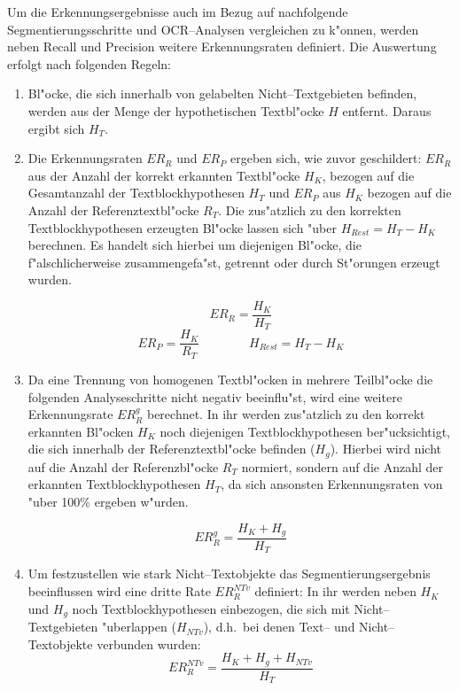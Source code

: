 Um die Erkennungsergebnisse auch im Bezug auf nachfolgende Segmentierungsschritte und OCR--Analysen
vergleichen zu k"onnen, werden neben Recall und Precision weitere Erkennungsraten definiert.
Die Auswertung erfolgt nach folgenden Regeln:
\begin{enumerate}
  \item Bl"ocke, die sich innerhalb von gelabelten Nicht--Textgebieten befinden,
  werden aus der Menge der hypothetischen Textbl"ocke $H$ entfernt. Daraus ergibt sich $H_T$.
  
  \item Die Erkennungsraten $ER_{R}$ und $ER_{P}$ ergeben sich, wie zuvor geschildert:
  $ER_{R}$ aus der Anzahl der korrekt erkannten Textbl"ocke $H_K$, bezogen auf die 
  Gesamtanzahl der Textblockhypothesen $H_T$ und $ER_{P}$ aus $H_K$ bezogen auf die Anzahl
  der Referenztextbl"ocke $R_T$. Die zus"atzlich zu den korrekten Textblockhypothesen
  erzeugten Bl"ocke lassen sich "uber $ H_{Rest} = H_T - H_K$ berechnen. Es handelt sich hierbei
  um diejenigen Bl"ocke, die f"alschlicherweise zusammengefa"st, 
  getrennt oder durch St"orungen erzeugt wurden.
  
  $$ER_{R} = \frac{H_K}{H_T}$$
  $$ER_{P} = \frac{H_K}{R_T}\qquad\qquad H_{Rest} = H_T - H_K$$
  
  \item Da eine Trennung von homogenen Textbl"ocken in mehrere Teilbl"ocke die folgenden
  Analyseschritte nicht negativ beeinflu"st, wird eine weitere Erkennungsrate $ER_{R}^{g}$
  berechnet. In ihr werden zus"atzlich zu den korrekt erkannten Bl"ocken $H_K$ noch diejenigen
  Textblockhypothesen ber"ucksichtigt, die sich innerhalb der Referenztextbl"ocke befinden 
  ($H_{g}$). Hierbei wird nicht auf die Anzahl der Referenzbl"ocke $R_T$ normiert,
  sondern auf die Anzahl der erkannten Textblockhypothesen $H_T$, da sich ansonsten 
  Erkennungsraten von "uber 100\% ergeben w"urden.
  
  $$ER_{R}^{g} = \frac{H_K + H_{g}}{H_T}$$
    
  \item Um festzustellen wie stark Nicht--Textobjekte das Segmentierungsergebnis beeinflussen wird
  eine dritte Rate $ER_{R}^{NTv}$ definiert: In ihr werden neben $H_K$ und 
  $H_{g}$ noch Textblockhypothesen einbezogen, die sich mit Nicht--Textgebieten "uberlappen 
  ($H_{NTv}$), d.h.\ bei denen Text-- und Nicht--Textobjekte verbunden wurden:
  $$ER_{R}^{NTv} = \frac{H_K + H_{g} + H_{NTv}}{H_T}$$
\end{enumerate}

